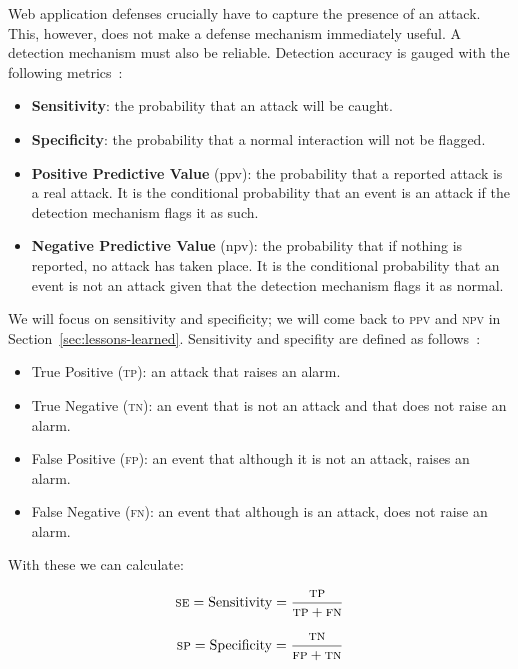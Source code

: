 \documentclass[conference]{IEEEtran}
\begin{document}
Web application defenses 
crucially have to capture the presence of an attack. This, however, does not
make a defense mechanism immediately useful. A
detection mechanism must also be reliable.
Detection accuracy is gauged with the following
metrics~\cite{TDR2013,GFDLS06,A00}:
\begin{itemize}
\item {\bf Sensitivity}: the probability that an attack will be
  caught.
\item {\bf Specificity}: the probability that a normal interaction
  will not be flagged.
\item {\bf Positive Predictive Value} ({\sc ppv}): the probability that a
  reported attack is a real attack. It is the conditional probability
  that an event is an attack if the detection mechanism flags it as
  such. 
\item {\bf Negative Predictive Value} ({\sc npv}): the probability that if
  nothing is reported, no attack has taken place. It is the conditional
  probability that an event is not an attack given that the detection
  mechanism flags it as normal.
\end{itemize}

\noindent
We will focus on sensitivity and specificity; we will come back to
\textsc{ppv} and \textsc{npv} in Section~\ref{sec:lessons-learned}.
Sensitivity and specifity are defined as follows~\cite{linn2004}:
\begin{itemize}
\item True Positive (\textsc{tp}): an attack that raises an alarm.
\item True Negative (\textsc{tn}): an event that is not an attack and that does
  not raise an alarm.
\item False Positive (\textsc{fp}): an event that although it is not an attack,
  raises an alarm.
\item False Negative (\textsc{fn}): an event that although is an attack, does
  not raise an alarm.
\end{itemize}

\noindent
With these we can calculate:

\begin{equation}
  \textsc{se} = \textrm{Sensitivity} = \frac{\textsc{tp}}{\textsc{tp}
    + \textsc{fn}}
\label{eq:sensitivity}
\end{equation}

\begin{equation}
  \textsc{sp} = \textrm{Specificity} = \frac{\textsc{tn}}{\textsc{fp}
    + \textsc{tn}}
\label{eq:specificity}
\end{equation}
\end{document}
